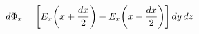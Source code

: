 \documentclass[preview]{standalone}
\begin{document}
\begin{align*}
\special{dvisvgm:raw <g id='unique000'>}d\Phi_x=\left[E_x\!\left(x+\frac{dx}{2}\right)-E_x\!\left(x-\frac{dx}{2}\right)\right]dy\,dz\special{dvisvgm:raw </g>}
\end{align*}
\end{document}
